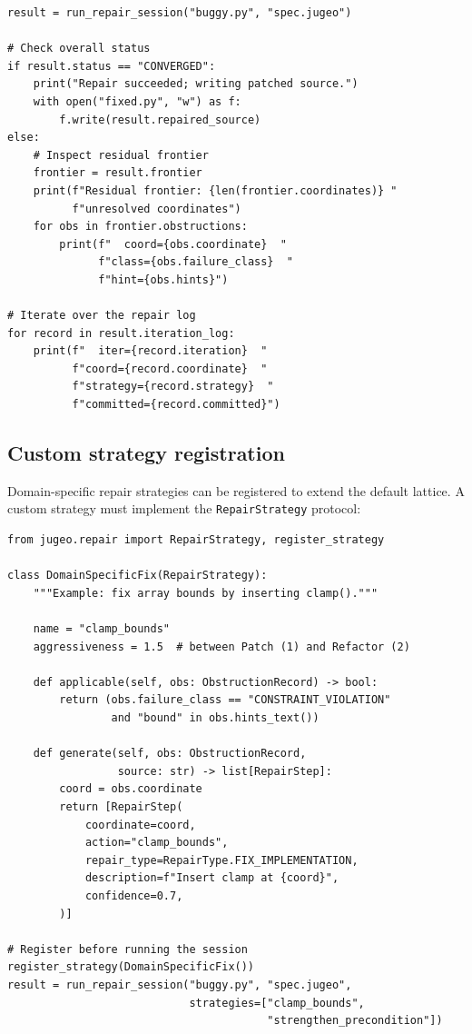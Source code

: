 \documentclass[11pt]{article}
\begin{document}
\begin{lstlisting}[style=jugeo-python,caption={Frontier inspection API.}]
result = run_repair_session("buggy.py", "spec.jugeo")

# Check overall status
if result.status == "CONVERGED":
    print("Repair succeeded; writing patched source.")
    with open("fixed.py", "w") as f:
        f.write(result.repaired_source)
else:
    # Inspect residual frontier
    frontier = result.frontier
    print(f"Residual frontier: {len(frontier.coordinates)} "
          f"unresolved coordinates")
    for obs in frontier.obstructions:
        print(f"  coord={obs.coordinate}  "
              f"class={obs.failure_class}  "
              f"hint={obs.hints}")

# Iterate over the repair log
for record in result.iteration_log:
    print(f"  iter={record.iteration}  "
          f"coord={record.coordinate}  "
          f"strategy={record.strategy}  "
          f"committed={record.committed}")
\end{lstlisting}

\subsection{Custom strategy registration}

Domain-specific repair strategies can be registered to extend the
default lattice.  A custom strategy must implement the
\texttt{RepairStrategy} protocol:

\begin{lstlisting}[style=jugeo-python,caption={Custom strategy registration.}]
from jugeo.repair import RepairStrategy, register_strategy

class DomainSpecificFix(RepairStrategy):
    """Example: fix array bounds by inserting clamp()."""

    name = "clamp_bounds"
    aggressiveness = 1.5  # between Patch (1) and Refactor (2)

    def applicable(self, obs: ObstructionRecord) -> bool:
        return (obs.failure_class == "CONSTRAINT_VIOLATION"
                and "bound" in obs.hints_text())

    def generate(self, obs: ObstructionRecord,
                 source: str) -> list[RepairStep]:
        coord = obs.coordinate
        return [RepairStep(
            coordinate=coord,
            action="clamp_bounds",
            repair_type=RepairType.FIX_IMPLEMENTATION,
            description=f"Insert clamp at {coord}",
            confidence=0.7,
        )]

# Register before running the session
register_strategy(DomainSpecificFix())
result = run_repair_session("buggy.py", "spec.jugeo",
                            strategies=["clamp_bounds",
                                        "strengthen_precondition"])
\end{lstlisting}
\end{document}
